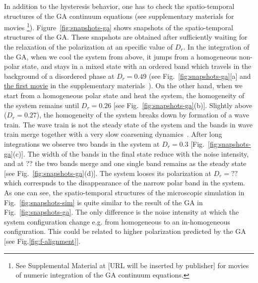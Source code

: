 \documentclass[reprint,floatfix,amsmath,amssymb,aps,pre,showkeys,showpacs,superscriptaddress]{revtex4-1}
\newcommand{\hl}[1]{\textcolor{hlcolor}{#1}}
\begin{document}
In addition to the hysteresis behavior, one has to check the spatio-temporal structures of the GA continuum equations (see supplementary materials for movies \footnote{See Supplemental Material at [URL will be inserted by publisher] for movies of numeric integration of the GA continuum equations.}). Figure~\ref{fig:snapshots-ga} shows snapshots of the spatio-temporal structures of the GA. \hl{These snapshots are obtained after sufficiently waiting for the relaxation of the polarization at an specific value of $D_r$.} In \hl{the} integration of the GA, when we cool the system \hl{from above}, it jumps from a homogeneous non-polar state, \hl{and stays in} a mixed state with an ordered band which travels in the background of a disordered phase \hl{at $D_r=0.49$} (see Fig.~\ref{fig:snapshots-ga}[a] and \href{SI1-cooling-GA.mp4}{the first movie} in the supplementary materials~\cite{Note1}). On the other hand, when we start from a homogeneous polar state and heat the system, the homogeneity of the system remains until $D_r=0.26$ [see Fig.~\ref{fig:snapshots-ga}(b)]. \hl{Slightly above ($D_r=0.27$), the homogeneity of the system breaks down by formation of a wave train. The wave train is not the steady state of the system and the bands in wave train merge together with a very slow coarsening dynamics~\cite{solon2015pattern}. After long integrations we observe two bands in the system at $D_r=0.3$ [Fig.~\ref{fig:snapshots-ga}(c)]. The width of the bands in the final state reduce with the noise intensity, and at ?? the two bands merge and one single band remains as the steady state [see Fig.~\ref{fig:snapshots-ga}(d)]. The system looses its polarization at $D_r=??$ which correspnds to the disappearance of the narrow polar band in the system. As one can see, the spatio-temporal structures of the microscopic simulation in Fig.~\ref{fig:snapshots-sim} is quite similar to the result of the GA in Fig.~\ref{fig:snapshots-ga}. The only difference is the noise intensity at which the system configuration change e.g. from homogeneous to an in-homogeneous configuration. This could be related to higher polarization predicted by the GA [see Fig.\ref{fig:f-alignment}].}
\end{document}
